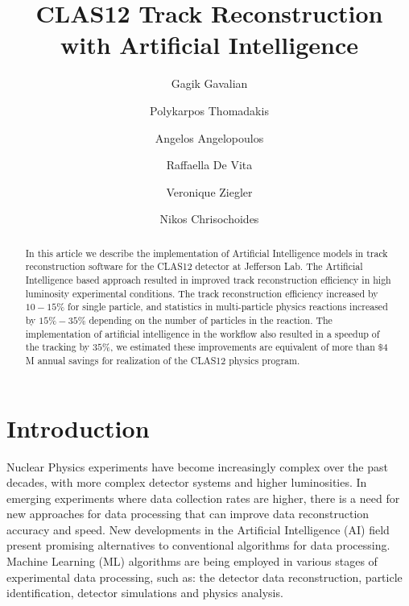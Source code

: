 \documentclass[aps,prl,preprint,12pt]{revtex4}
\begin{document}
\begin{CJK*}{GB}{}
\title{CLAS12 Track Reconstruction with Artificial Intelligence}

\author{Gagik Gavalian}
\author{Polykarpos Thomadakis}
\author{Angelos Angelopoulos}
\author{Raffaella De Vita}
\author{Veronique Ziegler}
\author{Nikos Chrisochoides}

\begin{abstract}
  In this article we describe the implementation of Artificial Intelligence models in track reconstruction
  software for the CLAS12 detector at Jefferson Lab. The Artificial Intelligence based approach resulted 
  in improved track reconstruction efficiency in high luminosity experimental conditions.  The track
 reconstruction efficiency increased by $10-15\%$ for single particle, and statistics in multi-particle physics 
 reactions increased by $15\%-35\%$ depending on the number of particles in the reaction. The implementation 
 of artificial intelligence in the workflow also resulted in a speedup of the tracking by $35\%$, we estimated these 
 improvements are equivalent of more than $\$4$M  annual savings for realization of the CLAS12 physics program.
\end{abstract}

\maketitle
\end{CJK*}

\section{Introduction}
\indent

Nuclear Physics experiments have become increasingly complex over the past decades, with more complex detector 
systems and higher luminosities. In emerging experiments where data collection rates are higher, there is a need for 
new approaches for data processing that can improve data reconstruction accuracy and speed. New developments in 
the Artificial Intelligence (AI) field present promising alternatives to conventional algorithms for data processing. 
Machine Learning (ML) algorithms are being employed in various stages of experimental data processing, such as: 
the detector data reconstruction, particle identification, detector simulations and physics analysis. 
\end{document}
